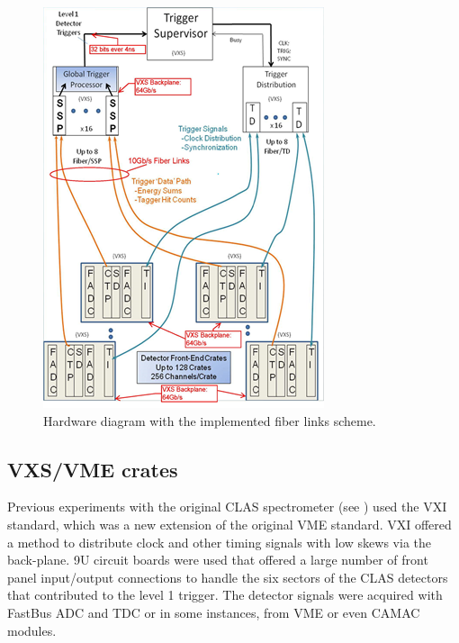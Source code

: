 \begin{figure}[hbt]
	\centering
	\includegraphics[width=1.0\columnwidth,keepaspectratio]{img/hardware_diagram.png}
	\caption{Hardware diagram with the implemented fiber links scheme.}
	\label{fig:hardwarediagram}
\end{figure}


\subsection{VXS/VME crates}

Previous experiments with the original CLAS spectrometer (see \cite{clas-nim}) used the VXI standard, which was a new extension of the original VME standard. VXI offered a method to distribute clock and other timing signals with low skews via the back-plane. 9U circuit boards were used that offered a large number of front panel input/output connections to handle the six sectors of the CLAS detectors that contributed to the level 1 trigger. The detector signals were acquired with FastBus ADC and TDC or in some instances, from VME or even CAMAC modules. 

